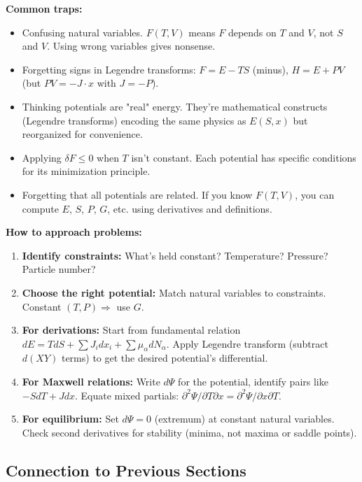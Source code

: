 \documentclass[9pt,twocoloumn]{article}
\begin{document}
\textbf{Common traps:}

\begin{itemize}
    \item Confusing natural variables. $F(T, V)$ means $F$ depends on $T$ and $V$, not $S$ and $V$. Using wrong variables gives nonsense.
    \item Forgetting signs in Legendre transforms: $F = E - TS$ (minus), $H = E + PV$ (but $PV = -J \cdot x$ with $J = -P$).
    \item Thinking potentials are "real" energy. They're mathematical constructs (Legendre transforms) encoding the same physics as $E(S, x)$ but reorganized for convenience.
    \item Applying $\delta F \leq 0$ when $T$ isn't constant. Each potential has specific conditions for its minimization principle.
    \item Forgetting that all potentials are related. If you know $F(T, V)$, you can compute $E$, $S$, $P$, $G$, etc. using derivatives and definitions.
\end{itemize}

\textbf{How to approach problems:}

\begin{enumerate}
    \item \textbf{Identify constraints:} What's held constant? Temperature? Pressure? Particle number?

    \item \textbf{Choose the right potential:} Match natural variables to constraints. Constant $(T, P) \Rightarrow$ use $G$.

    \item \textbf{For derivations:} Start from fundamental relation $dE = T dS + \sum J_i dx_i + \sum \mu_\alpha dN_\alpha$. Apply Legendre transform (subtract $d(XY)$ terms) to get the desired potential's differential.

    \item \textbf{For Maxwell relations:} Write $d\Psi$ for the potential, identify pairs like $-S dT + J dx$. Equate mixed partials: $\partial^2 \Psi / \partial T \partial x = \partial^2 \Psi / \partial x \partial T$.

    \item \textbf{For equilibrium:} Set $d\Psi = 0$ (extremum) at constant natural variables. Check second derivatives for stability (minima, not maxima or saddle points).
\end{enumerate}

\subsection{Connection to Previous Sections}
\end{document}
